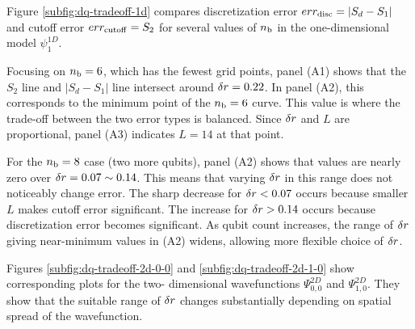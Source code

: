 \documentclass[a4paper,11pt]{article}
\begin{document}
Figure \ref{subfig:dq-tradeoff-1d} compares discretization error
$err_{\mathrm{disc}}=|S_d-S_1|$ and cutoff error $err_{\mathrm{cutoff}}=S_2$ for several values of
$n_{\mathrm{b}}$ in the one-dimensional model $\psi_1^{1D}$.

Focusing on $n_{\mathrm{b}}=6$, which has the fewest grid points, panel (A1) shows that the
$S_2$ line and $|S_d-S_1|$ line intersect around $\delta r=0.22$. In panel (A2),
this corresponds to the minimum point of the $n_{\mathrm{b}}=6$ curve. This value is where
the trade-off between the two error types is balanced. Since $\delta r$ and $L$
are proportional, panel (A3) indicates $L=14$ at that point.

For the $n_{\mathrm{b}}=8$ case (two more qubits), panel (A2) shows that values are nearly
zero over $\delta r=0.07\sim0.14$. This means that varying $\delta r$ in this
range does not noticeably change error. The sharp decrease for $\delta r<0.07$
occurs because smaller $L$ makes cutoff error significant. The increase for
$\delta r>0.14$ occurs because discretization error becomes significant. As qubit
count increases, the range of $\delta r$ giving near-minimum values in (A2)
widens, allowing more flexible choice of $\delta r$.

Figures \ref{subfig:dq-tradeoff-2d-0-0} and
\ref{subfig:dq-tradeoff-2d-1-0} show corresponding plots for the two-
dimensional wavefunctions $\Psi_{0,0}^{2D}$ and $\Psi_{1,0}^{2D}$. They show
that the suitable range of $\delta r$ changes substantially depending on spatial
spread of the wavefunction.
\end{document}
